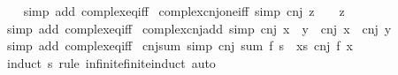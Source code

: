 \begin{isabellebody}
%
\isadelimproof
\ \ %
\endisadelimproof
%
\isatagproof
{}\isamarkupfalse%
\ {\isacharparenleft}{\kern0pt}simp\ add{\isacharcolon}{\kern0pt}\ complex{\isacharunderscore}{\kern0pt}eq{\isacharunderscore}{\kern0pt}iff{\isacharparenright}{\kern0pt}%
\endisatagproof
{\isafoldproof}%
%
\isadelimproof
\isanewline
%
\endisadelimproof
\isanewline
{}\isamarkupfalse%
\ complex{\isacharunderscore}{\kern0pt}cnj{\isacharunderscore}{\kern0pt}one{\isacharunderscore}{\kern0pt}iff\ {\isacharbrackleft}{\kern0pt}simp{\isacharbrackright}{\kern0pt}{\isacharcolon}{\kern0pt}\ {\isachardoublequoteopen}cnj\ z\ {\isacharequal}{\kern0pt}\ {}\ {\isasymlongleftrightarrow}\ z\ {\isacharequal}{\kern0pt}\ {}{\isachardoublequoteclose}\isanewline
%
\isadelimproof
\ \ %
\endisadelimproof
%
\isatagproof
{}\isamarkupfalse%
\ {\isacharparenleft}{\kern0pt}simp\ add{\isacharcolon}{\kern0pt}\ complex{\isacharunderscore}{\kern0pt}eq{\isacharunderscore}{\kern0pt}iff{\isacharparenright}{\kern0pt}%
\endisatagproof
{\isafoldproof}%
%
\isadelimproof
\isanewline
%
\endisadelimproof
\isanewline
{}\isamarkupfalse%
\ complex{\isacharunderscore}{\kern0pt}cnj{\isacharunderscore}{\kern0pt}add\ {\isacharbrackleft}{\kern0pt}simp{\isacharbrackright}{\kern0pt}{\isacharcolon}{\kern0pt}\ {\isachardoublequoteopen}cnj\ {\isacharparenleft}{\kern0pt}x\ {\isacharplus}{\kern0pt}\ y{\isacharparenright}{\kern0pt}\ {\isacharequal}{\kern0pt}\ cnj\ x\ {\isacharplus}{\kern0pt}\ cnj\ y{\isachardoublequoteclose}\isanewline
%
\isadelimproof
\ \ %
\endisadelimproof
%
\isatagproof
{}\isamarkupfalse%
\ {\isacharparenleft}{\kern0pt}simp\ add{\isacharcolon}{\kern0pt}\ complex{\isacharunderscore}{\kern0pt}eq{\isacharunderscore}{\kern0pt}iff{\isacharparenright}{\kern0pt}%
\endisatagproof
{\isafoldproof}%
%
\isadelimproof
\isanewline
%
\endisadelimproof
\isanewline
{}\isamarkupfalse%
\ cnj{\isacharunderscore}{\kern0pt}sum\ {\isacharbrackleft}{\kern0pt}simp{\isacharbrackright}{\kern0pt}{\isacharcolon}{\kern0pt}\ {\isachardoublequoteopen}cnj\ {\isacharparenleft}{\kern0pt}sum\ f\ s{\isacharparenright}{\kern0pt}\ {\isacharequal}{\kern0pt}\ {\isacharparenleft}{\kern0pt}{\isasymSum}x{\isasymin}s{\isachardot}{\kern0pt}\ cnj\ {\isacharparenleft}{\kern0pt}f\ x{\isacharparenright}{\kern0pt}{\isacharparenright}{\kern0pt}{\isachardoublequoteclose}\isanewline
%
\isadelimproof
\ \ %
\endisadelimproof
%
\isatagproof
{}\isamarkupfalse%
\ {\isacharparenleft}{\kern0pt}induct\ s\ rule{\isacharcolon}{\kern0pt}\ infinite{\isacharunderscore}{\kern0pt}finite{\isacharunderscore}{\kern0pt}induct{\isacharparenright}{\kern0pt}\ auto%

\end{isabellebody}
